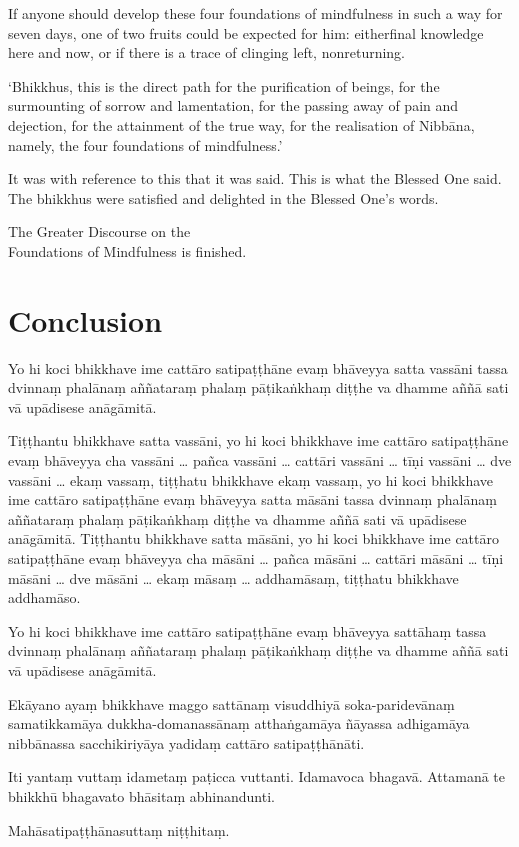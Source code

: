 If anyone should develop these four foundations of mindfulness in such a way
for seven days, one of two fruits could be expected for him: eitherfinal
knowledge here and now, or if there is a trace of clinging left, nonreturning.

`Bhikkhus, this is the direct path for the purification of beings, for the
surmounting of sorrow and lamentation, for the passing away of pain and
dejection, for the attainment of the true way, for the realisation of Nibbāna,
namely, the four foundations of mindfulness.'

It was with reference to this that it was said. This is what the Blessed One
said. The bhikkhus were satisfied and delighted in the Blessed One's words.

\bigskip

{\centering\instructionFont\color{instruction}\upshape

  The Greater Discourse on the\\
  Foundations of Mindfulness is finished.

}

\paliPage
\chapter*{Conclusion}

Yo hi koci bhikkhave ime cattāro satipaṭṭhāne evaṃ bhāveyya satta vassāni tassa
dvinnaṃ phalānaṃ aññataraṃ phalaṃ pāṭikaṅkhaṃ diṭṭhe va dhamme aññā sati vā
upādisese anāgāmitā.

Tiṭṭhantu bhikkhave satta vassāni, yo hi koci bhikkhave ime cattāro satipaṭṭhāne
evaṃ bhāveyya cha vassāni \ldots{} pañca vassāni \ldots{} cattāri vassāni
\ldots{} tīṇi vassāni \ldots{} dve vassāni \ldots{} ekaṃ vassaṃ, tiṭṭhatu
bhikkhave ekaṃ vassaṃ, yo hi koci bhikkhave ime cattāro satipaṭṭhāne evaṃ
bhāveyya satta māsāni tassa dvinnaṃ phalānaṃ aññataraṃ phalaṃ pāṭikaṅkhaṃ diṭṭhe
va dhamme aññā sati vā upādisese anāgāmitā. Tiṭṭhantu bhikkhave satta māsāni, yo
hi koci bhikkhave ime cattāro satipaṭṭhāne evaṃ bhāveyya cha māsāni \ldots{}
pañca māsāni \ldots{} cattāri māsāni \ldots{} tīṇi māsāni \ldots{} dve māsāni
\ldots{} ekaṃ māsaṃ \ldots{} addhamāsaṃ, tiṭṭhatu bhikkhave addhamāso.

Yo hi koci bhikkhave ime cattāro satipaṭṭhāne evaṃ bhāveyya sattāhaṃ tassa
dvinnaṃ phalānaṃ aññataraṃ phalaṃ pāṭikaṅkhaṃ diṭṭhe va dhamme aññā sati vā
upādisese anāgāmitā.

Ekāyano ayaṃ bhikkhave maggo sattānaṃ visuddhiyā soka-paridevānaṃ samatikkamāya
dukkha-domanassānaṃ atthaṅgamāya ñāyassa adhigamāya nibbānassa sacchikiriyāya
yadidaṃ cattāro satipaṭṭhānāti.

Iti yantaṃ vuttaṃ idametaṃ paṭicca vuttanti. Idamavoca bhagavā. Attamanā te
bhikkhū bhagavato bhāsitaṃ abhinandunti.

\bigskip

{\centering\instructionFont\color{instruction}\upshape

  Mahāsatipaṭṭhānasuttaṃ niṭṭhitaṃ.

}

\resumeNormalText
